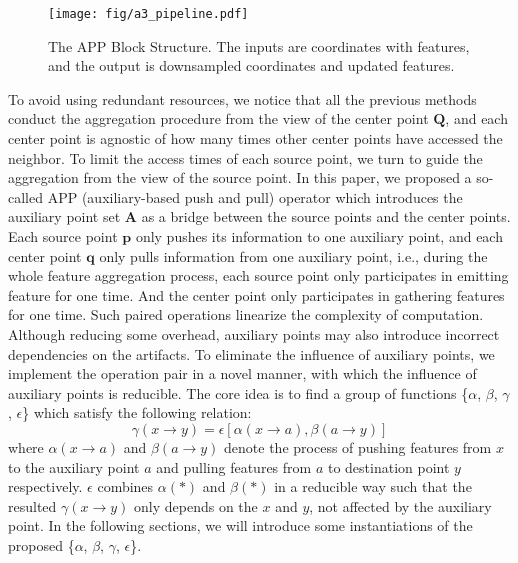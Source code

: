 \documentclass[journal]{IEEEtran}
\begin{document}
\begin{figure*}[tbp]
\begin{center}
\texttt{[image: fig/a3\_pipeline.pdf]}
\end{center}
   \caption{The APP Block Structure. The inputs are coordinates with features, and the output is downsampled coordinates and updated features.}
\end{figure*}


To avoid using redundant resources, we notice that all the previous methods conduct the aggregation procedure from the view of the center point $\mathbf{Q}$, and each center point is agnostic of how many times other center points have accessed the neighbor. To limit the access times of each source point, we turn to guide the aggregation from the view of the source point. In this paper, we proposed a so-called APP (\textcolor[rgb]{1,0,0}{a}uxiliary-based \textcolor[rgb]{1,0,0}{p}ush and \textcolor[rgb]{1,0,0}{p}ull) operator which introduces the auxiliary point set $\mathbf{A}$ as a bridge between the source points and the center points. Each source point $\mathbf{p}$ only pushes its information to one auxiliary point, and each center point $\mathbf{q}$ only pulls information from one auxiliary point, i.e., during the whole feature aggregation process, each source point only participates in emitting feature for one time. And the center point only participates in gathering features for one time. Such paired operations linearize the complexity of computation. Although reducing some overhead, auxiliary points may also introduce incorrect dependencies on the artifacts. To eliminate the influence of auxiliary points, we implement the operation pair in a novel manner, with which the influence of auxiliary points is reducible. The core idea is to find a group of functions \{$\alpha$, $\beta$, $\gamma$, $\epsilon$\} which satisfy the following relation:
\begin{equation}
\label{eq:opcondition}
    \gamma(x\to y)=\epsilon[\alpha(x\to a), \beta(a\to y)]
\end{equation}
\noindent
where $\alpha(x\to a)$ and $\beta(a\to y)$ denote the process of pushing features from $x$ to the auxiliary point $a$ and pulling features from $a$ to destination point $y$ respectively. $\epsilon$  combines $\alpha(*)$ and $\beta(*)$ in a reducible way such that the resulted $\gamma(x\to y)$ only depends on the $x$ and $y$, not affected by the auxiliary point. In the following sections, we will introduce some instantiations of the proposed \{$\alpha$, $\beta$, $\gamma$, $\epsilon$\}.
\end{document}
